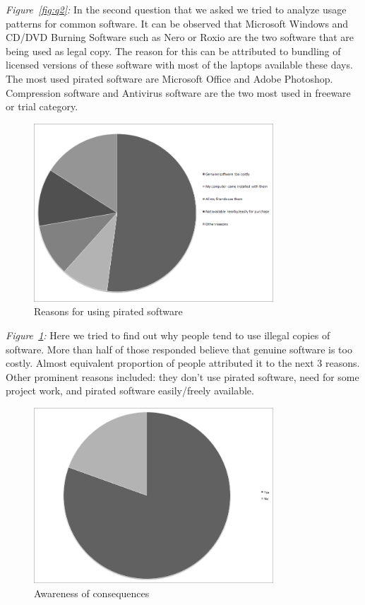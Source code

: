 \emph{Figure~\ref{fig:q2}:} In the second question that we asked we tried to analyze usage patterns for common software. It can be observed that Microsoft Windows and CD/DVD Burning Software such as Nero or Roxio are the two software that are being used as legal copy. The reason for this can be attributed to bundling of licensed versions of these software with most of the laptops available these days. The most used pirated software are Microsoft Office and Adobe Photoshop. Compression software and Antivirus software are the two most used in freeware or trial category.

\newpage
\begin{figure}[h!]
\centering
\includegraphics[width=0.8\textwidth]{./q3.png}
\caption{Reasons for using pirated software}
\label{fig:q3}
\end{figure}

\emph{Figure~\ref{fig:q3}:} Here we tried to find out why people tend to use illegal copies of software. More than half of those responded believe that genuine software is too costly. Almost equivalent proportion of people attributed it to the next 3 reasons. Other prominent reasons included: they don't use pirated software, need for some project work, and pirated software easily/freely available.

\newpage
\begin{figure}[h!]
\centering
\includegraphics[width=0.8\textwidth]{./q4.png}
\caption{Awareness of consequences}
\label{fig:q4}
\end{figure}

